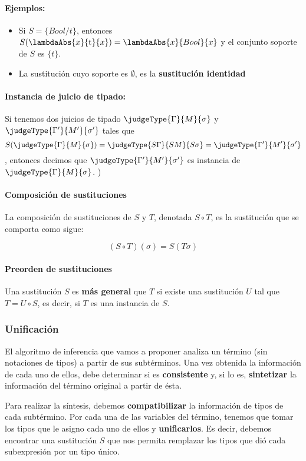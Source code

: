 \paragraph{Ejemplos:}
\begin{itemize}
	\item Si $S = \{  Bool/t \}$, entonces $S(\lambdaAbs{x}{\text{t}}{x}) = \lambdaAbs{x}{ Bool}{x}$ y el conjunto soporte de $S$ es $\{t\}$.
	\item La sustitución cuyo soporte es $\emptyset$, es la \textbf{sustitución identidad}
\end{itemize}

\paragraph{Instancia de juicio de tipado:}
Si tenemos dos juicios de tipado $\judgeType{\Gamma}{M}{\sigma}$ y $\judgeType{\Gamma'}{M'}{\sigma'}$ tales que $$S(\judgeType{\Gamma}{M}{\sigma}) = \judgeType{S\Gamma}{SM}{S\sigma} =\judgeType{\Gamma'}{M'}{\sigma'}$$, entonces decimos que $\judgeType{\Gamma'}{M'}{\sigma'}$ es instancia de $\judgeType{\Gamma}{M}{\sigma}$. )

\paragraph{Composición de sustituciones} La composición de sustituciones de $S$ y $T$, denotada $S\circ T$, es la sustitución que se comporta como sigue:

$$(S\circ T)(\sigma) = S(T\sigma)$$

\paragraph{Preorden de sustituciones} Una sustitución $S$ es \textbf{más general} que $T$ si existe una sustitución $U$ tal que $T = U\circ S$, es decir, si $T$ es una instancia de $S$.


\subsubsection{Unificación}
El algoritmo de inferencia que vamos a proponer analiza un término (sin notaciones de tipos) a partir de sus subtérminos. Una vez obtenida la información de cada uno de ellos, debe determinar si es \textbf{consistente} y, si lo es, \textbf{sintetizar} la información del término original a partir de ésta.

Para realizar la síntesis, debemos \textbf{compatibilizar} la información de tipos de cada subtérmino. Por cada una de las variables del término, tenemos que tomar los tipos que le asigno cada uno de ellos y \textbf{unificarlos}. Es decir, debemos encontrar una sustitución $S$ que nos permita remplazar los tipos que dió cada subexpresión por un tipo único. 


